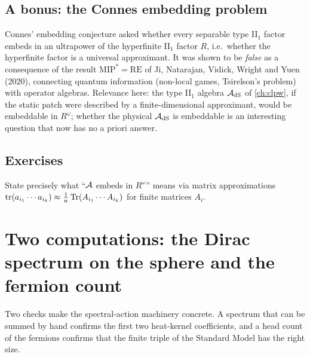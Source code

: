 \subsection*{A bonus: the Connes embedding problem}
Connes' embedding conjecture asked whether every separable type II$_1$ factor embeds in an ultrapower of the hyperfinite II$_1$ factor $R$, i.e.\ whether the hyperfinite factor is a universal approximant. It was shown to be \emph{false} as a consequence of the result $\mathrm{MIP}^*=\mathrm{RE}$ of Ji, Natarajan, Vidick, Wright and Yuen \cite{MIPstarRE} (2020), connecting quantum information (non-local games, Tsirelson's problem) with operator algebras. Relevance here: the type II$_1$ algebra $\mathcal{A}_{\rm dS}$ of \cref{ch:clpw}, if the static patch were described by a finite-dimensional approximant, would be embeddable in $R^\omega$; whether the physical $\mathcal{A}_{\rm dS}$ is embeddable is an interesting question that now has no a priori answer.

\subsection*{Exercises}
\begin{exercise}\label{ex:bridge:1}
State precisely what ``$\mathcal{A}$ embeds in $R^\omega$'' means via matrix approximations $\operatorname{tr}(a_{i_1}\cdots a_{i_k})\approx\frac1{n}\operatorname{Tr}(A_{i_1}\cdots A_{i_k})$ for finite matrices $A_i$.
\end{exercise}


\section{Two computations: the Dirac spectrum on the sphere and the fermion count}\label{ch:ncgcomp}
\begin{physmotiv}
Two checks make the spectral-action machinery concrete. A spectrum that can be summed by hand confirms the first two heat-kernel coefficients, and a head count of the fermions confirms that the finite triple of the Standard Model has the right size.
\end{physmotiv}

